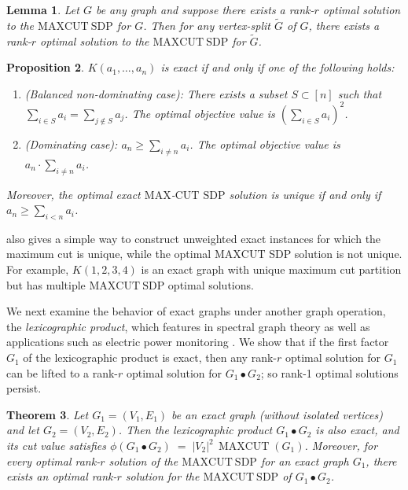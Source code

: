 \documentclass[a4paper,fleqn]{cas-sc}
\newcommand{\1}{\mathbf{1}}
\DeclareMathOperator{\mc}{MAXCUT}
\newtheorem{theorem}{Theorem}
\newtheorem{lemma}[theorem]{Lemma}
\newtheorem{proposition}[theorem]{Proposition}
\begin{document}
\begin{lemma}\label{splitlemma}
Let $G$ be any graph and suppose there exists a rank-$r$ optimal solution to the $\mathrm{MAXCUT\ SDP}$ for $G$. Then for any vertex-split $\widetilde{G}$ of $G$, there exists a rank-$r$ optimal solution to the $\mathrm{MAXCUT\ SDP}$ for $\widetilde{G}$.
\end{lemma}

\begin{proposition}\label{cor:complete}
$K(a_1,\dots, a_n)$ is exact if and only if one of the following holds:
\begin{enumerate}
    \item (Balanced non-dominating case): There exists a subset $S \subset [n]$ such that $\sum_{i \in S} a_i = \sum_{j \notin S} a_j$. The optimal objective value is $\left(\sum_{i \in S} a_i\right)^2$.
    \item (Dominating case): $a_n \geq \sum_{i \neq n} a_i$. The optimal objective value is $a_n \cdot \sum_{i \neq n} a_i$.
\end{enumerate}
Moreover, the optimal exact $\mathrm{MAX}$-$\mathrm{CUT}$ $\mathrm{SDP}$ solution is unique if and only if $a_n \geq \sum_{i < n} a_i$.
\end{proposition}
\begin{remark}
 also gives a simple way to construct unweighted exact
instances for which the maximum cut is unique, while the optimal
\(\mathrm{MAXCUT}\) SDP solution is not unique. For example, \(K(1,2,3,4)\) is an exact graph with unique maximum cut partition but has multiple $\mathrm{MAXCUT\ SDP}$ optimal solutions.
\end{remark}

We next examine the behavior of exact graphs under another graph operation, the \emph{lexicographic product}, which features in spectral graph theory \citep{barik2015laplacian} as well as applications such as electric power monitoring \citep{dorbec2008power}. We show that if the first factor $G_1$ of the lexicographic product is exact, then any rank-$r$ optimal solution for $G_1$ can be lifted to a rank-$r$ optimal solution for $G_1 \bullet G_2$; so rank-1 optimal solutions persist.

\begin{theorem}\label{thm:1}
Let $G_1=(V_1,E_1)$ be an exact graph (without isolated vertices) and let $G_2=(V_2,E_2)$. Then the lexicographic product $G_1\!\bullet\! G_2$ is also exact, and its cut value satisfies $\phi(G_1\!\bullet\! G_2) \;=\; |V_2|^2 \,\mc(G_1)$. Moreover, for every optimal rank-$r$ solution of the $\mathrm{MAXCUT\ SDP}$ for an exact graph $G_1$, there exists an optimal rank-$r$ solution for the $\mathrm{MAXCUT\ SDP}$ of $G_1\!\bullet\! G_2$.
\end{theorem}
\end{document}
